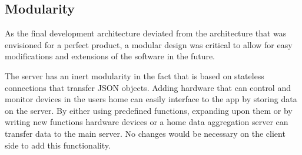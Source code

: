 \subsection{Modularity}
\label{sec:modularity}
As the final development architecture deviated from the architecture that was envisioned for a perfect product, a modular design was critical to allow for easy modifications and 
extensions of the software in the future. 

The server has an inert  modularity in the fact that is based on stateless connections that transfer JSON objects. Adding hardware that can control and monitor devices in the users 
home can easily interface to the app by storing data on the server. By either using predefined functions, expanding upon them or by writing new functions hardware devices or a home 
data aggregation server can transfer data to the main server. No changes would be necessary on the client side to add this functionality. 